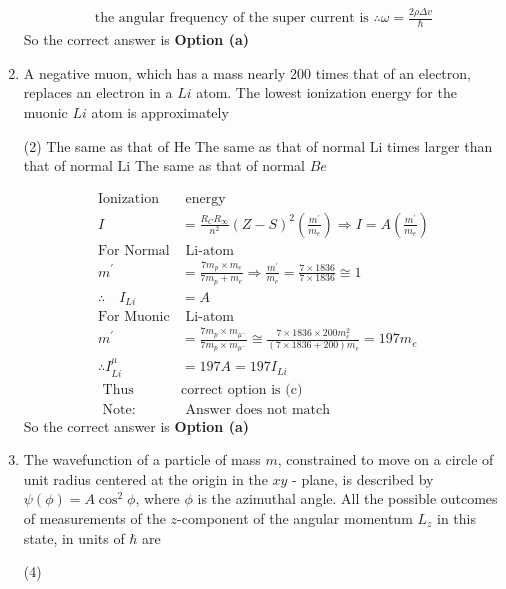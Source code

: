 \begin{enumerate}
\begin{answer}
\begin{align*}
	\text{the angular frequency of the super current is }\therefore \omega=\frac{2 \rho \Delta v}{\hbar} 
	\end{align*}
		So the correct answer is \textbf{Option (a)}
\end{answer}
\item A negative muon, which has a mass nearly 200 times that of an electron, replaces an electron in a $L i$ atom. The lowest ionization energy for the muonic $L i$ atom is approximately
 \begin{tasks}(2)
	\task[\textbf{a.}]The same as that of He
	\task[\textbf{b.}] The same as that of normal $\mathrm{Li}$
	 times larger than that of normal $\mathrm{Li}$
	\task[\textbf{d.}] The same as that of normal $B e$
\end{tasks}
\begin{answer}
	\begin{align*}
	\text{Ionization}&\text{ energy}\\
	I&=\frac{R_{C} R_{\infty}}{n^{2}}(Z-S)^{2}\left(\frac{m^{\prime}}{m_{e}}\right) \Rightarrow I=A\left(\frac{m^{\prime}}{m_{e}}\right)\\
	\text{For Normal}&\text{ Li-atom}\\
	m^{\prime}&=\frac{7 m_{p} \times m_{e}}{7 m_{p}+m_{e}} \Rightarrow \frac{m^{\prime}}{m_{e}}=\frac{7 \times 1836}{7 \times 1836} \cong 1 \\
	\therefore \quad I_{L i}&=A\\
	\text{For Muonic}&\text{ Li-atom}\\
	m^{\prime}&=\frac{7 m_{p} \times m_{\mu^{-}}}{7 m_{p} \times m_{\mu^{-}}} \cong \frac{7 \times 1836 \times 200 m_{e}^{2}}{(7 \times 1836+200) m_{e}}=197 m_{e} \\
	\therefore I_{L i}^{\mu}&=197 A=197 I_{L i}\\
	\text { Thus  }&\text{correct option is (c) }\\
	\text { Note: }&\text{ Answer  does not match}
	\end{align*}
		So the correct answer is \textbf{Option (a)}
\end{answer}
\item The wavefunction of a particle of mass $m$, constrained to move on a circle of unit radius centered at the origin in the $x y$ - plane, is described by $\psi(\phi)=A \cos ^{2} \phi$, where $\phi$ is the azimuthal angle. All the possible outcomes of measurements of the $z$-component of the angular momentum $L_{z}$ in this state, in units of $\hbar$ are
 \begin{tasks}(4)

\end{tasks}
\end{enumerate}
